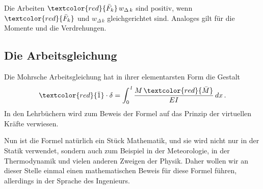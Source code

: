 Die Arbeiten $\textcolor{red}{\bar{F}_{k}}\,w_{\Delta\,k}$ sind positiv, wenn $\textcolor{red}{\bar{F}_k}$ und $w_{\Delta\,k}$ gleichgerichtet sind. Analoges gilt f\"{u}r die Momente und die Verdrehungen.
\\

{\textcolor{blau2}{\section{Die Arbeitsgleichung}}}
Die Mohrsche Arbeitsgleichung hat in ihrer elementarsten Form die Gestalt
\begin{align}
\textcolor{red}{\bar{1}}\cdot\delta = \int_0^{\,l} \frac{M\,\textcolor{red}{\bar{M}}}{EI}\,dx\,.
\end{align}
In den Lehrb\"{u}chern wird zum Beweis der Formel auf das Prinzip der virtuellen Kr\"{a}fte verwiesen.

Nun ist die Formel nat\"{u}rlich ein St\"{u}ck Mathematik, und sie wird nicht nur in der Statik verwendet, sondern auch zum Beispiel in der Meteorologie, in der Thermodynamik und vielen anderen Zweigen der Physik.  Daher wollen wir an dieser Stelle einmal einen mathe\-matischen Beweis f\"{u}r diese Formel f\"{u}hren, allerdings in der Sprache des Ingenieurs.

